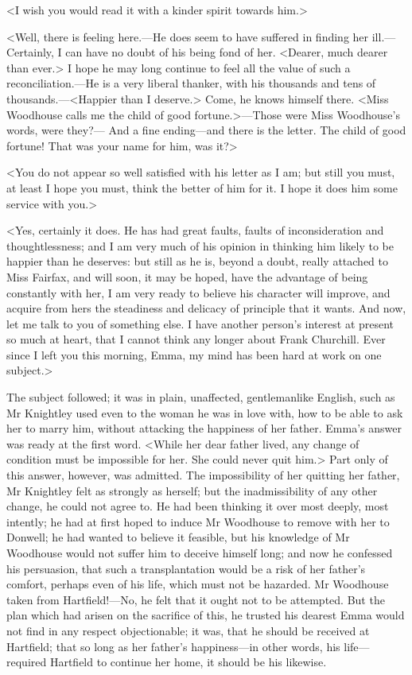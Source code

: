 <I wish you would read it with a kinder spirit towards him.>

<Well, there is feeling here.—He does seem to have suffered in finding her ill.—Certainly, I can have no doubt of his being fond of her. <Dearer, much dearer than ever.> I hope he may long continue to feel all the value of such a reconciliation.—He is a very liberal thanker, with his thousands and tens of thousands.—<Happier than I deserve.> Come, he knows himself there. <Miss Woodhouse calls me the child of good fortune.>—Those were Miss Woodhouse's words, were they?— And a fine ending—and there is the letter. The child of good fortune! That was your name for him, was it?>

<You do not appear so well satisfied with his letter as I am; but still you must, at least I hope you must, think the better of him for it. I hope it does him some service with you.>

<Yes, certainly it does. He has had great faults, faults of inconsideration and thoughtlessness; and I am very much of his opinion in thinking him likely to be happier than he deserves: but still as he is, beyond a doubt, really attached to Miss Fairfax, and will soon, it may be hoped, have the advantage of being constantly with her, I am very ready to believe his character will improve, and acquire from hers the steadiness and delicacy of principle that it wants. And now, let me talk to you of something else. I have another person's interest at present so much at heart, that I cannot think any longer about Frank Churchill. Ever since I left you this morning, Emma, my mind has been hard at work on one subject.>

The subject followed; it was in plain, unaffected, gentlemanlike English, such as Mr Knightley used even to the woman he was in love with, how to be able to ask her to marry him, without attacking the happiness of her father. Emma's answer was ready at the first word. <While her dear father lived, any change of condition must be impossible for her. She could never quit him.> Part only of this answer, however, was admitted. The impossibility of her quitting her father, Mr Knightley felt as strongly as herself; but the inadmissibility of any other change, he could not agree to. He had been thinking it over most deeply, most intently; he had at first hoped to induce Mr Woodhouse to remove with her to Donwell; he had wanted to believe it feasible, but his knowledge of Mr Woodhouse would not suffer him to deceive himself long; and now he confessed his persuasion, that such a transplantation would be a risk of her father's comfort, perhaps even of his life, which must not be hazarded. Mr Woodhouse taken from Hartfield!—No, he felt that it ought not to be attempted. But the plan which had arisen on the sacrifice of this, he trusted his dearest Emma would not find in any respect objectionable; it was, that he should be received at Hartfield; that so long as her father's happiness—in other words, his life—required Hartfield to continue her home, it should be his likewise.

